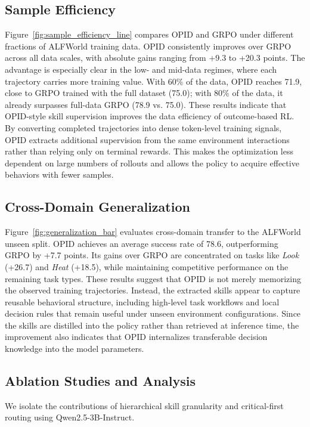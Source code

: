 \subsection{Sample Efficiency}\label{subsec33_efficiency_analysis}
Figure~\ref{fig:sample_efficiency_line} compares OPID and GRPO under different fractions of ALFWorld training data. OPID consistently improves over GRPO across all data scales, with absolute gains ranging from +9.3 to +20.3 points. The advantage is especially clear in the low- and mid-data regimes, where each trajectory carries more training value. With 60\% of the data, OPID reaches 71.9, close to GRPO trained with the full dataset (75.0); with 80\% of the data, it already surpasses full-data GRPO (78.9 vs. 75.0). These results indicate that OPID-style skill supervision improves the data efficiency of outcome-based RL. By converting completed trajectories into dense token-level training signals, OPID extracts additional supervision from the same environment interactions rather than relying only on terminal rewards. This makes the optimization less dependent on large numbers of rollouts and allows the policy to acquire effective behaviors with fewer samples.

\subsection{Cross-Domain Generalization}\label{subsec34_cross_domain_generalization}
Figure~\ref{fig:generalization_bar} evaluates cross-domain transfer to the ALFWorld unseen split. OPID achieves an average success rate of 78.6, outperforming GRPO by +7.7 points. Its gains over GRPO are concentrated on tasks like \textit{Look} (+26.7) and \textit{Heat} (+18.5), while maintaining competitive performance on the remaining task types. These results suggest that OPID is not merely memorizing the observed training trajectories. Instead, the extracted skills appear to capture reusable behavioral structure, including high-level task workflows and local decision rules that remain useful under unseen environment configurations. Since the skills are distilled into the policy rather than retrieved at inference time, the improvement also indicates that OPID internalizes transferable decision knowledge into the model parameters.




\subsection{Ablation Studies and Analysis}
We isolate the contributions of hierarchical skill granularity and critical-first routing using Qwen2.5-3B-Instruct.

